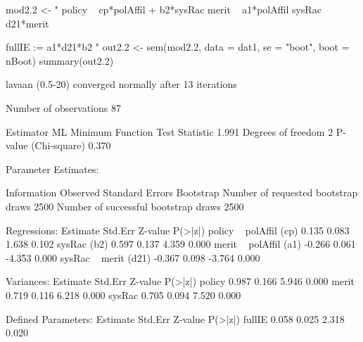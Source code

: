 \begin{Schunk}
\begin{Sinput}
 mod2.2 <- "
 policy ~ cp*polAffil + b2*sysRac
 merit ~ a1*polAffil
 sysRac ~ d21*merit
 
 fullIE := a1*d21*b2
 "
 out2.2 <- 
     sem(mod2.2, data = dat1, se = "boot", boot = nBoot)
 summary(out2.2)
\end{Sinput}
\begin{Soutput}
lavaan (0.5-20) converged normally after  13 iterations

  Number of observations                            87

  Estimator                                         ML
  Minimum Function Test Statistic                1.991
  Degrees of freedom                                 2
  P-value (Chi-square)                           0.370

Parameter Estimates:

  Information                                 Observed
  Standard Errors                            Bootstrap
  Number of requested bootstrap draws             2500
  Number of successful bootstrap draws            2500

Regressions:
                   Estimate  Std.Err  Z-value  P(>|z|)
  policy ~                                            
    polAffil  (cp)    0.135    0.083    1.638    0.102
    sysRac    (b2)    0.597    0.137    4.359    0.000
  merit ~                                             
    polAffil  (a1)   -0.266    0.061   -4.353    0.000
  sysRac ~                                            
    merit    (d21)   -0.367    0.098   -3.764    0.000

Variances:
                   Estimate  Std.Err  Z-value  P(>|z|)
    policy            0.987    0.166    5.946    0.000
    merit             0.719    0.116    6.218    0.000
    sysRac            0.705    0.094    7.520    0.000

Defined Parameters:
                   Estimate  Std.Err  Z-value  P(>|z|)
    fullIE            0.058    0.025    2.318    0.020
\end{Soutput}
\end{Schunk}
